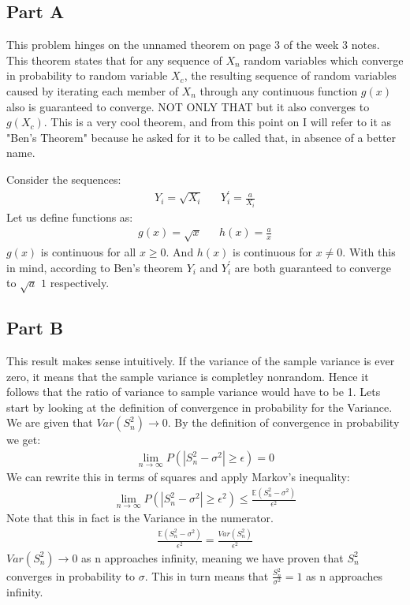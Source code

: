 \documentclass{article}
\begin{document}
\subsection*{Part A}
This problem hinges on the unnamed theorem on page 3 of the week 3 notes. This theorem states that for any sequence of $X_n$ random variables which converge in probability to random variable $X_c$, the resulting sequence of random variables caused by iterating each member of $X_n$ through any continuous function $g(x)$ also is guaranteed to converge. NOT ONLY THAT but it also converges to $g(X_c)$. This is a very cool theorem, and from this point on I will refer to it as "Ben's Theorem" because he asked for it to be called that, in absence of a better name.

	Consider the sequences:
\begin{align*}
Y_i=\sqrt{X_i} && Y^{'}_{i}=\tfrac{a}{X_i}
\end{align*}
Let us define functions as:
\begin{align*}
g(x) = \sqrt{x} && h(x)=\tfrac{a}{x}
\end{align*}
$g(x)$ is continuous for all $x\geq0$. And $h(x)$ is continuous for $x\neq 0$. With this in mind, according to Ben's theorem $Y_i$ and $Y^{'}_{i}$ are both guaranteed to converge to $\sqrt{a}$ $1$ respectively.
\subsection*{Part B}
This result makes sense intuitively. If the variance of the sample variance is ever zero, it means that the sample variance is completley nonrandom. Hence it follows that the ratio of variance to sample variance would have to be 1. Lets start by looking at the definition of convergence in probability for the Variance. We are given that $Var(S^2_n)\rightarrow 0$. By the definition of convergence in probability we get:
\begin{align*}
\lim_{n \rightarrow \infty} P(|S^2_n-\sigma^2| \geq \epsilon) = 0
\end{align*}
We can rewrite this in terms of squares and apply Markov's inequality:
\begin{align*}
\lim_{n \rightarrow \infty} P(|S^2_n-\sigma^2| \geq \epsilon^2) \leq \frac{\mathbb{E}(S^2_n - \sigma^2)}{\epsilon^2}
\end{align*}
Note that this in fact is the Variance in the numerator.
\begin{align*}
\frac{\mathbb{E}(S^2_n - \sigma^2)}{\epsilon^2} = \frac{Var(S^2_n)}{\epsilon^2}
\end{align*}
$Var(S^2_n) \rightarrow 0$ as n approaches infinity, meaning we have proven that $S^2_n$ converges in probability to $\sigma$. This in turn means that $\boxed{ \frac{S^2_n}{\sigma^2}=1} $ as n approaches infinity.
\end{document}
